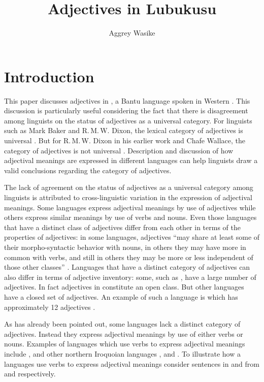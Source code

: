 \documentclass[output=paper,
modfonts
]{langscibook}
\title{Adjectives in Lubukusu }
\author{Aggrey Wasike \affiliation{University of Toronto } 
}
\begin{document}
\maketitle
 
 

\section[Introduction]{Introduction}\label{sec:wasike:1}

This paper discusses adjectives in , a Bantu language spoken in Western . This discussion is particularly useful considering the fact that there is disagreement among linguists on the status of adjectives as a universal category. For linguists such as Mark Baker and  R.\,M.\,W. Dixon, the lexical category of adjectives is universal \citep{Baker2001,Baker2003,DixonAikhenvald2004}. But for  R.\,M.\,W. Dixon in his earlier work and Chafe Wallace, the category of adjectives is not universal \citep{Dixon1982,Chafe2012}. Description and discussion of how adjectival meanings are expressed in different languages can help linguists draw a valid conclusions regarding the category of adjectives. 

The lack of agreement on the status of adjectives as a universal category among linguists is attributed to cross-linguistic variation in the expression of adjectival meanings. Some languages express adjectival meanings by use of adjectives while others express similar meanings by use of verbs and nouns. Even those languages that have a distinct class of adjectives differ from each other in terms of the properties of adjectives: in some languages, adjectives “may share at least some of their morpho-syntactic behavior with nouns, in others they may have more in common with verbs, and still in others they may be more or less independent of those other classes” \citep[1]{Chafe2012}. Languages that have a distinct category of adjectives can also differ in terms of adjective inventory: some, such as , have a large number of adjectives. In fact adjectives in  constitute an open class. But other languages have a closed set of adjectives. An example of such a language is  which has approximately 12 adjectives \citep{Whaley1997}.

As has already been pointed out, some languages lack a distinct category of adjectives. Instead they express adjectival meanings by use of either verbs or nouns. Examples of languages which use verbs to express adjectival meanings include  \citep{Baker2001},  and other northern Iroquoian languages \citep{Chafe2012},  \citep{Bhat1994} and . To illustrate how a languages use verbs to express adjectival meanings consider sentences in  and  from  and  respectively.
\end{document}

